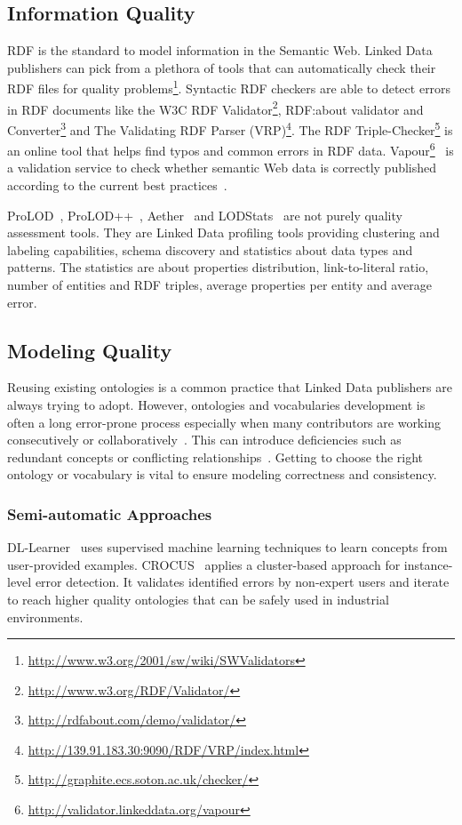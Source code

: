 \subsection{Information Quality}
RDF is the standard to model information in the Semantic Web. Linked Data publishers can pick from a plethora of tools that can automatically check their RDF files for quality problems\footnote{\url{http://www.w3.org/2001/sw/wiki/SWValidators}}. Syntactic RDF checkers are able to detect errors in RDF documents like the W3C RDF Validator\footnote{\url{http://www.w3.org/RDF/Validator/}}, RDF:about validator and Converter\footnote{\url{http://rdfabout.com/demo/validator/}} and The Validating RDF Parser (VRP)\footnote{\url{http://139.91.183.30:9090/RDF/VRP/index.html}}. The RDF Triple-Checker\footnote{\url{http://graphite.ecs.soton.ac.uk/checker/}} is an online tool that helps find typos and common errors in RDF data. Vapour\footnote{\url{http://validator.linkeddata.org/vapour}}~\cite{Berrueta:SFSW:08} is a validation service to check whether semantic Web data is correctly published according to the current best practices~\cite{Berners-Lee:W3C:06}.

ProLOD~\cite{Bohm:ICDEW:10}, ProLOD++~\cite{Abedjan:ICDE:14}, Aether~\cite{Makela:ESWC:14} and LODStats~\cite{Auer:EKAW:12} are not purely quality assessment tools. They are Linked Data profiling tools providing clustering and labeling capabilities, schema discovery and statistics about data types and patterns. The statistics are about properties distribution, link-to-literal ratio, number of entities and RDF triples, average properties per entity and average error.

\subsection{Modeling Quality}
Reusing existing ontologies is a common practice that Linked Data publishers are always trying to adopt. However, ontologies and vocabularies development is often a long error-prone process especially when many contributors are working consecutively or collaboratively~\cite{Suominen:DataSemantics:13}. This can introduce deficiencies such as redundant concepts or conflicting relationships~\cite{Harpring:Getty:10}. Getting to choose the right ontology or vocabulary is vital to ensure modeling correctness and consistency.

\subsubsection{Semi-automatic Approaches}
DL-Learner~\cite{Lehmann:MLResearch:09} uses supervised machine learning techniques to learn concepts from user-provided examples. CROCUS~\cite{Cherix:WASABI:14} applies a cluster-based approach for instance-level error detection. It validates identified errors by non-expert users and iterate to reach higher quality ontologies that can be safely used in industrial environments.

